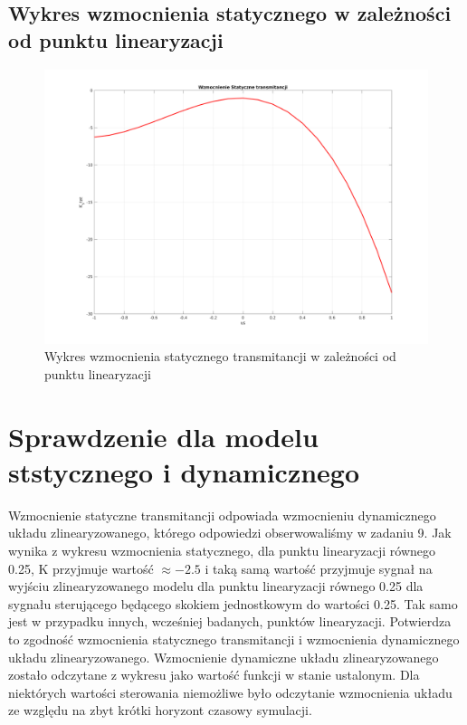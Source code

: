 \documentclass[a4paper, 11pt]{article}
\begin{document}
\subsection{Wykres wzmocnienia statycznego w zależności od punktu linearyzacji}
\begin{figure}[H]
\centering
\includegraphics[scale=0.5]{stat.png}
\caption{Wykres wzmocnienia statycznego transmitancji w zależności od punktu linearyzacji}
\end{figure}

\section{Sprawdzenie dla modelu ststycznego i dynamicznego}
Wzmocnienie statyczne transmitancji odpowiada wzmocnieniu dynamicznego układu zlinearyzowanego, którego odpowiedzi obserwowaliśmy w zadaniu 9. Jak wynika z wykresu wzmocnienia statycznego, dla punktu linearyzacji równego 0.25, K przyjmuje wartość $\approx -2.5$ i taką samą wartość przyjmuje sygnał na wyjściu zlinearyzowanego modelu dla punktu linearyzacji równego 0.25 dla sygnału sterującego będącego skokiem jednostkowym do wartości 0.25. Tak samo jest w przypadku innych, wcześniej badanych, punktów linearyzacji. Potwierdza to zgodność wzmocnienia statycznego transmitancji i wzmocnienia dynamicznego układu zlinearyzowanego. Wzmocnienie dynamiczne układu zlinearyzowanego zostało odczytane z wykresu jako wartość funkcji w stanie ustalonym. Dla niektórych wartości sterowania niemożliwe było odczytanie wzmocnienia układu ze względu na zbyt krótki horyzont czasowy symulacji. 
\end{document}
